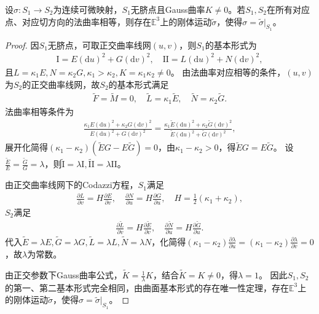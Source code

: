 \documentclass[../../main.tex]{subfiles}%
\begin{document}
\begin{theorem}
设$\sigma:S_1\to S_2$为连续可微映射，$S_1$无脐点且Gauss曲率$K\neq0$。若$S_1,S_2$在所有对应点、对应切方向的法曲率相等，则存在$\mathbb{E}^3$上的刚体运动$\tilde{\sigma}$，使得$\sigma=\tilde{\sigma}|_{S_1}$。
\end{theorem}
\begin{proof}
因$S_1$无脐点，可取正交曲率线网$(u,v)$，则$S_1$的基本形式为
\begin{align*}
\mathrm{I}=E(\mathrm{d}u)^2+G(\mathrm{d}v)^2,\quad \mathrm{II}=L(\mathrm{d}u)^2+N(\mathrm{d}v)^2,
\end{align*}
且$L=\kappa_1E,N=\kappa_2G,\kappa_1>\kappa_2,K=\kappa_1\kappa_2\neq0$。
由法曲率对应相等的条件，$(u,v)$为$S_2$的正交曲率线网，故$S_2$的基本形式满足
\begin{align*}
\tilde{F}=\tilde{M}=0,\quad \tilde{L}=\kappa_1\tilde{E},\quad \tilde{N}=\kappa_2\tilde{G}.
\end{align*}
法曲率相等条件为
\begin{align*}
\frac{\kappa_1E(\mathrm{d}u)^2+\kappa_2G(\mathrm{d}v)^2}{E(\mathrm{d}u)^2+G(\mathrm{d}v)^2}=
\frac{\kappa_1\tilde{E}(\mathrm{d}u)^2+\kappa_2\tilde{G}(\mathrm{d}v)^2}{\tilde{E}(\mathrm{d}u)^2+\tilde{G}(\mathrm{d}v)^2},
\end{align*}
展开化简得$(\kappa_1-\kappa_2)(\tilde{E}G-E\tilde{G})=0$，由$\kappa_1-\kappa_2>0$，得$\tilde{E}G=E\tilde{G}$。
设$\frac{\tilde{E}}{E}=\frac{\tilde{G}}{G}=\lambda$，则$\tilde{\mathrm{I}}=\lambda\mathrm{I},\tilde{\mathrm{II}}=\lambda\mathrm{II}$。

由正交曲率线网下的Codazzi方程，$S_1$满足
\begin{align*}
\frac{\partial L}{\partial v}=H\frac{\partial E}{\partial v},\quad \frac{\partial N}{\partial u}=H\frac{\partial G}{\partial u},\quad H=\frac{1}{2}(\kappa_1+\kappa_2),
\end{align*}
$S_2$满足
\begin{align*}
\frac{\partial\tilde{L}}{\partial v}=H\frac{\partial\tilde{E}}{\partial v},\quad \frac{\partial\tilde{N}}{\partial u}=H\frac{\partial\tilde{G}}{\partial u}.
\end{align*}
代入$\tilde{E}=\lambda E,\tilde{G}=\lambda G,\tilde{L}=\lambda L,\tilde{N}=\lambda N$，化简得$(\kappa_1-\kappa_2)\frac{\partial\lambda}{\partial u}=(\kappa_1-\kappa_2)\frac{\partial\lambda}{\partial v}=0$，故$\lambda$为常数。

由正交参数下Gauss曲率公式，$\tilde{K}=\frac{1}{\lambda}K$，结合$\tilde{K}=K\neq0$，得$\lambda=1$。
因此$S_1,S_2$的第一、第二基本形式完全相同，由曲面基本形式的存在唯一性定理，存在$\mathbb{E}^3$上的刚体运动$\tilde{\sigma}$，使得$\sigma=\tilde{\sigma}|_{S_1}$。
\end{proof}
\end{document}

